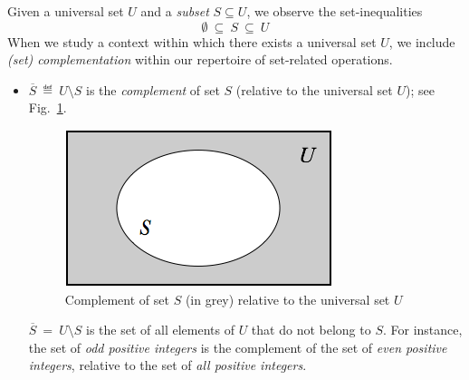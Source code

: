 \bigskip

\noindent {}
\bigskip

\noindent
Given a universal set $U$ and a {\em subset} $S \subseteq U$, we observe the set-inequalities
\[ \emptyset \ \subseteq \ S \ \subseteq \ U \]
When we study a context within which there exists a universal set $U$, we include {\it (set) complementation} within our repertoire of set-related operations.
\begin{itemize}
\item
$\overline{S} \ \eqdef \ U \setminus S$ is the {\em complement} of set $S$ (relative to the universal set $U$); see Fig.~\ref{fig:setComplement}.
\begin{figure}[htb]
\begin{center}
        \includegraphics[scale=0.4]{FiguresMaths/setComplement}
        \caption{Complement of set $S$ (in grey) relative to the universal set $U$}
        \label{fig:setComplement}
\end{center}
\end{figure}

\smallskip

$\overline{S} \ = \ U \setminus S$ is the set of all elements of $U$ that do not belong to $S$.  For instance, the set of {\em odd positive integers} is the complement of the set of {\em even positive integers}, relative to the set of {\em all positive integers}.
\end{itemize}

